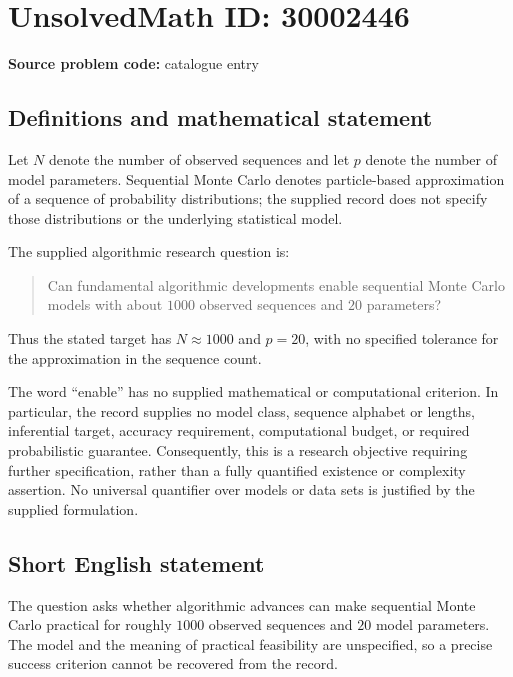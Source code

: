 \documentclass[11pt]{article}
\begin{document}
\section*{UnsolvedMath ID: 30002446}
\textbf{Source problem code:} catalogue entry
\subsection{Definitions and mathematical statement}
Let \(N\) denote the number of observed sequences and let \(p\) denote the number of model parameters. Sequential Monte Carlo denotes particle-based approximation of a sequence of probability distributions; the supplied record does not specify those distributions or the underlying statistical model.

The supplied algorithmic research question is:
\begin{quote}
Can fundamental algorithmic developments enable sequential Monte Carlo models with about \(1000\) observed sequences and \(20\) parameters?
\end{quote}
Thus the stated target has \(N\approx 1000\) and \(p=20\), with no specified tolerance for the approximation in the sequence count.

The word ``enable'' has no supplied mathematical or computational criterion. In particular, the record supplies no model class, sequence alphabet or lengths, inferential target, accuracy requirement, computational budget, or required probabilistic guarantee. Consequently, this is a research objective requiring further specification, rather than a fully quantified existence or complexity assertion. No universal quantifier over models or data sets is justified by the supplied formulation.
\subsection{Short English statement}
The question asks whether algorithmic advances can make sequential Monte Carlo practical for roughly \(1000\) observed sequences and \(20\) model parameters. The model and the meaning of practical feasibility are unspecified, so a precise success criterion cannot be recovered from the record.
\end{document}
